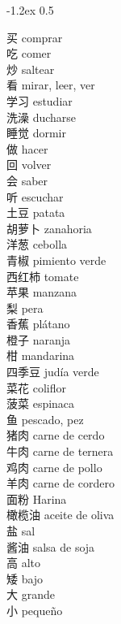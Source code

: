\documentclass[13pt]{article}
\begin{document}

{-1.2ex}
{0.5}

\begin{CJK*}{UTF8}{gkai}
\begin{multicols}{2}
\begin{pinyinscope}
\LARGE
\noindent
买 \quad comprar\\
吃 \quad comer\\
炒 \quad saltear\\
看 \quad mirar, leer, ver\\
学习 \quad estudiar\\
洗澡 \quad ducharse\\
睡觉 \quad dormir\\
做 \quad hacer\\
回 \quad volver\\
会 \quad saber\\
听 \quad escuchar\\
土豆 \quad patata\\
胡萝卜 \quad zanahoria\\
洋葱 \quad cebolla\\
青椒 \quad pimiento verde\\
西红柿 \quad tomate\\
苹果 \quad manzana\\
梨 \quad pera\\
香蕉 \quad plátano\\
橙子 \quad naranja\\
柑 \quad mandarina\\
四季豆 \quad judía verde\\
菜花 \quad coliflor\\
菠菜 \quad espinaca\\
鱼 \quad pescado, pez\\
猪肉 \quad carne de cerdo\\
牛肉 \quad carne de ternera\\
鸡肉 \quad carne de pollo\\
羊肉 \quad carne de cordero\\
面粉 \quad Harina\\
橄榄油 \quad aceite de oliva\\
盐 \quad sal\\
酱油 \quad salsa de soja\\
高 \quad alto\\
矮 \quad bajo\\
大 \quad grande\\
小 \quad pequeño\\

\end{pinyinscope}
\end{multicols}
\end{CJK*}
\end{document}
